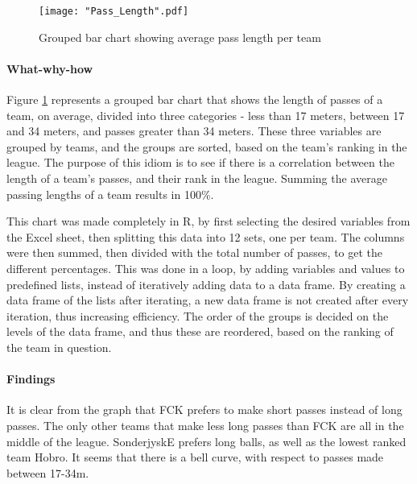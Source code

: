 \documentclass[Report.tex]{subfiles}
\begin{document}
\begin{figure}
\center
\texttt{[image: "Pass\_Length".pdf]}
\caption{Grouped bar chart showing average pass length per team}
\label{Fig:Pass_Length}
\end{figure}



\paragraph{What-why-how\\}
Figure \ref{Fig:Pass_Length} represents a grouped bar chart that shows the length of passes of a team, on average,
divided into three categories - less than 17 meters, between 17 and 34 meters,
and passes greater than 34 meters. These three variables are grouped by teams,
and the groups are sorted, based on the team's ranking in the league.
The purpose of this idiom is to see if there is a correlation between the length
of a team's passes, and their rank in the league.
Summing the average passing lengths of a team results in 100\%. 

This chart was made completely in R, by first selecting the desired variables
from the Excel sheet, then splitting this data into 12 sets, one per team. 
The columns were then summed, then divided with the total number of passes, to
get the different percentages. This was done in a loop, by adding variables and
values to predefined lists, instead of iteratively adding data to a data frame. 
By creating a data frame of the lists after iterating,
a new data frame is not created after every iteration, thus increasing
efficiency.
The order of the groups is decided on the levels of the data frame, and
thus these are reordered, based on the ranking of the team in question.

\paragraph{Findings\\}
It is clear from the graph that FCK prefers to make short passes instead of long passes. 
The only other teams that make less long passes than FCK are all in the middle of the league.
SonderjyskE prefers long balls, as well as the lowest ranked team Hobro. 
It seems that there is a bell curve, with respect to passes made between 17-34m.
\end{document}

